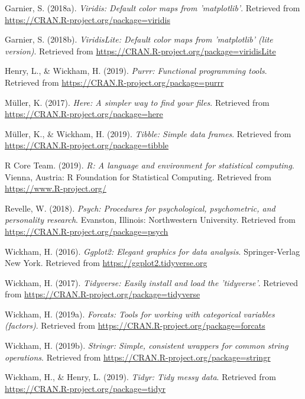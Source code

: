 \documentclass[man]{apa6}
\begin{document}
\hypertarget{ref-R-viridis}{}
Garnier, S. (2018a). \emph{Viridis: Default color maps from
'matplotlib'}. Retrieved from
\url{https://CRAN.R-project.org/package=viridis}

\hypertarget{ref-R-viridisLite}{}
Garnier, S. (2018b). \emph{ViridisLite: Default color maps from
'matplotlib' (lite version)}. Retrieved from
\url{https://CRAN.R-project.org/package=viridisLite}

\hypertarget{ref-R-purrr}{}
Henry, L., \& Wickham, H. (2019). \emph{Purrr: Functional programming
tools}. Retrieved from \url{https://CRAN.R-project.org/package=purrr}

\hypertarget{ref-R-here}{}
Müller, K. (2017). \emph{Here: A simpler way to find your files}.
Retrieved from \url{https://CRAN.R-project.org/package=here}

\hypertarget{ref-R-tibble}{}
Müller, K., \& Wickham, H. (2019). \emph{Tibble: Simple data frames}.
Retrieved from \url{https://CRAN.R-project.org/package=tibble}

\hypertarget{ref-R-base}{}
R Core Team. (2019). \emph{R: A language and environment for statistical
computing}. Vienna, Austria: R Foundation for Statistical Computing.
Retrieved from \url{https://www.R-project.org/}

\hypertarget{ref-R-psych}{}
Revelle, W. (2018). \emph{Psych: Procedures for psychological,
psychometric, and personality research}. Evanston, Illinois:
Northwestern University. Retrieved from
\url{https://CRAN.R-project.org/package=psych}

\hypertarget{ref-R-ggplot2}{}
Wickham, H. (2016). \emph{Ggplot2: Elegant graphics for data analysis}.
Springer-Verlag New York. Retrieved from
\url{https://ggplot2.tidyverse.org}

\hypertarget{ref-R-tidyverse}{}
Wickham, H. (2017). \emph{Tidyverse: Easily install and load the
'tidyverse'}. Retrieved from
\url{https://CRAN.R-project.org/package=tidyverse}

\hypertarget{ref-R-forcats}{}
Wickham, H. (2019a). \emph{Forcats: Tools for working with categorical
variables (factors)}. Retrieved from
\url{https://CRAN.R-project.org/package=forcats}

\hypertarget{ref-R-stringr}{}
Wickham, H. (2019b). \emph{Stringr: Simple, consistent wrappers for
common string operations}. Retrieved from
\url{https://CRAN.R-project.org/package=stringr}

\hypertarget{ref-R-tidyr}{}
Wickham, H., \& Henry, L. (2019). \emph{Tidyr: Tidy messy data}.
Retrieved from \url{https://CRAN.R-project.org/package=tidyr}
\end{document}
